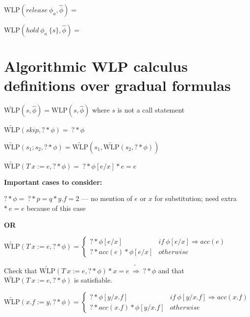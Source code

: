 \documentclass {article}
\newcommand{\eif}[3]{if \ ( #1 ) \ \{ #2 \} \ else \ \{#3\}}
\newcommand{\fphi}{\widehat{\phi}}
\newcommand{\imp}{\Rightarrow}
\newcommand{\timp}{\ \widetilde{\Rightarrow}\ }
\newcommand{\wlp}[2]{\text{WLP}(#1,#2)}
\newcommand{\twlp}[2]{\widetilde{\text{WLP}}(#1,#2)}
\begin{document}
\vspace{0.5cm}

$\wlp{release \ \phi_a}{\fphi} = $

\vspace{0.5cm}

$\wlp{hold \ \phi_a \ \{s\}}{\fphi} = $

\section{Algorithmic WLP calculus definitions over gradual formulas}
\hspace{0.5cm}

$\twlp{s}{\fphi} = \wlp{s}{\fphi} $ where $s$ is not a call statement

\vspace{0.5cm}

$\twlp{skip}{? \ast \phi} = \ ? \ast \phi$

\vspace{0.5cm}

$\twlp{s_1;s_2}{? \ast \phi} = \twlp{s_1}{\twlp{s_2}{? \ast \phi}} $

\vspace{0.5cm}

$\twlp{T \ x := e}{? \ast \phi} = \ ? \ast \phi[e/x] \ast e = e$

\textbf{Important cases to consider:}

$? \ast \phi = \ ? \ast p = q \ast y.f = 2$ --- no mention of $e$ or $x$ for substitution; need extra $\ast \ e = e$ because of this case

\textbf{OR}

$\twlp{T \ x := e}{? \ast \phi} =
	 \begin{cases}
	 ? \ast \phi[e/x] & if \ \phi[e/x] \imp acc(e) \\
	 ? \ast acc(e) \ast \phi[e/x] & otherwise
	\end{cases}$
	
Check that $\twlp{T \ x := e}{? \ast \phi} \ast x = e \timp ? \ast \phi$ and that $\twlp{T \ x := e}{? \ast \phi}$ is satisfiable.

\vspace{0.5cm}

%

$\twlp{x.f := y}{? \ast \phi} =
	\begin{cases}
	 ? \ast \phi[y/x.f] & if \ \phi[y/x.f] \imp acc(x.f) \\
	 ? \ast acc(x.f) \ast \phi[y/x.f] & otherwise
	\end{cases}$
\end{document}
